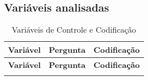\begin{anexosenv}

\chapter{Variáveis analisadas}
\label{anexo:A}

\renewcommand{\arraystretch}{1.3}

\begin{longtable}{|>{\raggedright\arraybackslash}p{4cm} 
                  |>{\raggedright\arraybackslash}p{8cm} 
                  |>{\raggedright\arraybackslash}p{4cm}|}
    \caption{Variáveis de Controle e Codificação}
    \label{tab:control_variables} \\
    \hline
    \textbf{Variável} & \textbf{Pergunta} & \textbf{Codificação} \\
    \hline
    \endfirsthead

    \hline
    \textbf{Variável} & \textbf{Pergunta} & \textbf{Codificação} \\
    \hline
    \endhead

    \hline
    \endfoot

    \hline
    \endlastfoot


\end{longtable}
\end{anexosenv}
